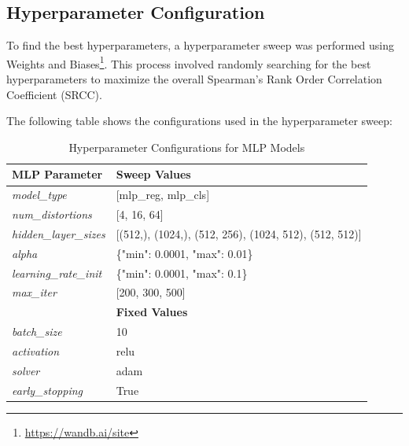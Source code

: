 \subsection{Hyperparameter Configuration}
\label{sub:HyperparamConfig}
To find the best hyperparameters, a hyperparameter sweep was performed using Weights and Biases\footnote{\url{https://wandb.ai/site}}. This process involved randomly searching for the best hyperparameters to maximize the overall Spearman’s Rank Order Correlation Coefficient (SRCC). \par
\vspace{\baselineskip}
\noindent
The following table shows the configurations used in the hyperparameter sweep: \par
\begin{table}[h]
    \centering
    \begin{tabular}{|l|l|}
        \hline
        \textbf{MLP Parameter} & \textbf{Sweep Values} \\
        \hline
        \textit{model\_type} & [mlp\_reg, mlp\_cls] \\
        \textit{num\_distortions} & [4, 16, 64] \\
        \textit{hidden\_layer\_sizes} & [(512,), (1024,), (512, 256), (1024, 512), (512, 512)] \\
        \textit{alpha} & \{"min": 0.0001, "max": 0.01\} \\
        \textit{learning\_rate\_init} & \{"min": 0.0001, "max": 0.1\} \\
        \textit{max\_iter} & [200, 300, 500] \\
        \hline
        \textbf{} & \textbf{Fixed Values} \\
        \hline
        \textit{batch\_size} & 10 \\
        \textit{activation} & relu \\
        \textit{solver} & adam \\
        \textit{early\_stopping} & True \\
        \hline
    \end{tabular}
    \caption{Hyperparameter Configurations for MLP Models}
    \label{table:mlp_hyperparams}
\end{table}
\vspace{\baselineskip}

